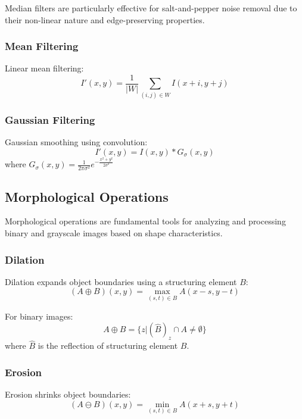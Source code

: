 \documentclass[a4paper, journal]{IEEEtran}
\begin{document}
Median filters are particularly effective for salt-and-pepper noise removal due to their non-linear nature and edge-preserving properties.

\subsubsection{Mean Filtering}
Linear mean filtering:
\begin{equation}
    I'(x,y) = \frac{1}{|W|} \sum_{(i,j) \in W} I(x+i, y+j)
\end{equation}

\subsubsection{Gaussian Filtering}
Gaussian smoothing using convolution:
\begin{equation}
    I'(x,y) = I(x,y) * G_\sigma(x,y)
\end{equation}
where $G_\sigma(x,y) = \frac{1}{2\pi\sigma^2}e^{-\frac{x^2+y^2}{2\sigma^2}}$

\subsection{Morphological Operations}
Morphological operations are fundamental tools for analyzing and processing binary and grayscale images based on shape characteristics.

\subsubsection{Dilation}
Dilation expands object boundaries using a structuring element $B$:
\begin{equation}
    (A \oplus B)(x,y) = \max_{(s,t) \in B} A(x-s, y-t)
\end{equation}

For binary images:
\begin{equation}
    A \oplus B = \{z | (\hat{B})_z \cap A \neq \emptyset\}
\end{equation}
where $\hat{B}$ is the reflection of structuring element $B$.

\subsubsection{Erosion}
Erosion shrinks object boundaries:
\begin{equation}
    (A \ominus B)(x,y) = \min_{(s,t) \in B} A(x+s, y+t)
\end{equation}
\end{document}
